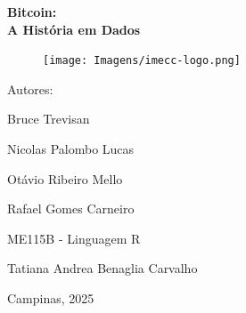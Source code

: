 \begin{titlepage}
    \centering
    \vspace*{2.5cm}
    
    {\Huge \bfseries Bitcoin: \\ A História em Dados \par}
    
    \vspace{2cm}

    \begin{figure} [h]
        \centering
        \texttt{[image: Imagens/imecc-logo.png]}
    \end{figure}

    { 
        {\large Autores: \par}
        {\large Bruce Trevisan \par}
        {\large Nicolas Palombo Lucas \par}
        {\large Otávio Ribeiro Mello \par}
        {\large Rafael Gomes Carneiro \par}
    }
    
    \vfill
    {\large ME115B - Linguagem R \par}
    {\large Tatiana Andrea Benaglia Carvalho \par}
    {\large Campinas, 2025 \par}
    
    
\end{titlepage}

\clearpage

\tableofcontents %
